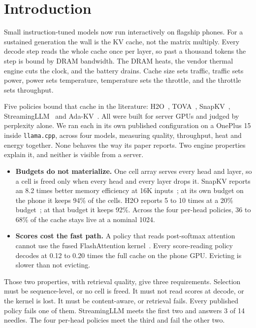 \documentclass[sigconf, anonymous=false, screen=true, 10pt]{acmart}
\begin{document}
\section{Introduction}
\label{sec:intro}

Small instruction-tuned models now run interactively on flagship phones. For a sustained generation the wall is the KV cache, not the matrix multiply. Every decode step reads the whole cache once per layer, so past a thousand tokens the step is bound by DRAM bandwidth. The DRAM heats, the vendor thermal engine cuts the clock, and the battery drains. Cache size sets traffic, traffic sets power, power sets temperature, temperature sets the throttle, and the throttle sets throughput.

Five policies bound that cache in the literature: H2O~\cite{zhang2023h2o}, TOVA~\cite{oren2024tova}, SnapKV~\cite{li2024snapkv}, StreamingLLM~\cite{xiao2024streamingllm} and Ada-KV~\cite{feng2025adakv}. All were built for server GPUs and judged by perplexity alone. We ran each in its own published configuration on a OnePlus 15 inside \texttt{llama.cpp}, across four models, measuring quality, throughput, heat and energy together. None behaves the way its paper reports. Two engine properties explain it, and neither is visible from a server.

\begin{itemize}[leftmargin=*, itemsep=1pt]
\item \textbf{Budgets do not materialize.} One cell array serves every head and layer, so a cell is freed only when every head and every layer drops it. SnapKV reports an 8.2 times better memory efficiency at 16K inputs~\cite{li2024snapkv}; at its own budget on the phone it keeps 94\% of the cells. H2O reports 5 to 10 times at a 20\% budget~\cite{zhang2023h2o}; at that budget it keeps 92\%. Across the four per-head policies, 36 to 68\% of the cache stays live at a nominal 1024.
\item \textbf{Scores cost the fast path.} A policy that reads post-softmax attention cannot use the fused FlashAttention kernel~\cite{dao2022flashattention}. Every score-reading policy decodes at 0.12 to 0.20 times the full cache on the phone GPU. Evicting is slower than not evicting.
\end{itemize}

Those two properties, with retrieval quality, give three requirements. Selection must be sequence-level, or no cell is freed. It must not read scores at decode, or the kernel is lost. It must be content-aware, or retrieval fails. Every published policy fails one of them. StreamingLLM meets the first two and answers 3 of 14 needles. The four per-head policies meet the third and fail the other two.
\end{document}
